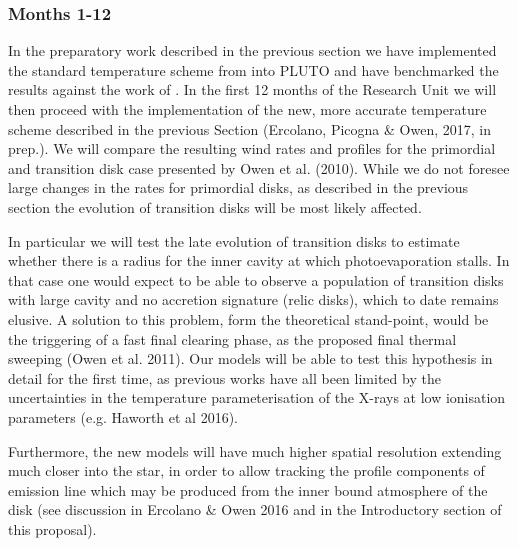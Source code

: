 \documentclass[10pt,fleqn,twoside]{article}
\begin{document}
\subsubsection{Months 1-12}
In the preparatory work described in the previous section we have
implemented the standard temperature scheme from 
\citet{2008ApJ...688..398E, 2009ApJ...699.1639E}
into PLUTO and have benchmarked the results against
the work of 
\citet{2010MNRAS.401.1415O}.
In the first 12 months of the Research
Unit we will then proceed with the implementation of the new, more accurate
temperature scheme described in the previous Section (Ercolano,
Picogna \& Owen, 2017, in prep.). We will compare the resulting
wind rates and profiles for the primordial and transition disk
case presented by Owen et al. (2010). While we do not foresee large
changes in the rates for primordial disks, as described in the
previous section the evolution of transition disks will be most 
likely affected. 

In particular we will test the late evolution of transition disks to
estimate whether there is a radius for the inner cavity at which
photoevaporation stalls. In that case one would expect to be able to
observe a population of transition disks with large cavity and no
accretion signature (relic disks), which to date remains elusive. A solution to this
problem, form the theoretical stand-point, would be the triggering of
a fast final clearing phase, as the proposed final thermal sweeping
(Owen et al. 2011). Our models will be able to test this hypothesis in
detail for the first time, as previous works have all been limited by
the uncertainties in the temperature parameterisation of the X-rays at
low ionisation parameters (e.g. Haworth et al 2016). 

Furthermore, the new models will have much higher spatial
resolution extending much closer into the star, in order to allow
tracking the profile components of emission line which may be produced from the inner bound
atmosphere of the disk (see discussion in Ercolano \& Owen 2016 and in
the Introductory section of this proposal).

\end{document}
